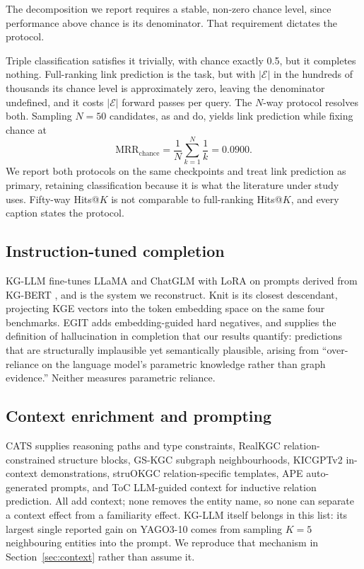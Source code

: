 \documentclass[conference]{IEEEtran}
\begin{document}
The decomposition we report requires a stable, non-zero chance level, since
performance above chance is its denominator. That requirement dictates the
protocol.

Triple classification satisfies it trivially, with chance exactly 0.5, but it
completes nothing. Full-ranking link prediction is the task, but with
$|\mathcal{E}|$ in the hundreds of thousands its chance level is approximately
zero, leaving the denominator undefined, and it costs $|\mathcal{E}|$ forward
passes per query. The $N$-way protocol resolves both. Sampling $N=50$
candidates, as \cite{cats} and \cite{realkgc} do, yields link prediction while
fixing chance at
\begin{equation}
\label{eq:chance}
\mathrm{MRR}_{\text{chance}}=\frac{1}{N}\sum_{k=1}^{N}\frac{1}{k}=0.0900 .
\end{equation}
We report both protocols on the same checkpoints and treat link prediction as
primary, retaining classification because it is what the literature under study
uses. Fifty-way Hits@$K$ is not comparable to full-ranking Hits@$K$, and every
caption states the protocol.

\subsection{Instruction-tuned completion}

KG-LLM \cite{kgllm,kgllama} fine-tunes
LLaMA and ChatGLM with LoRA \cite{lora} on prompts derived from KG-BERT
\cite{kgbert}, and is the system we reconstruct. Knit \cite{knit} is its closest
descendant, projecting KGE vectors into the token embedding space on the same
four benchmarks. EGIT \cite{egit} adds embedding-guided hard negatives, and
supplies the definition of hallucination in completion that our results
quantify: predictions that are structurally implausible yet semantically
plausible, arising from ``over-reliance on the language model's parametric
knowledge rather than graph evidence.'' Neither measures parametric reliance.

\subsection{Context enrichment and prompting}

CATS \cite{cats} supplies reasoning paths and
type constraints, RealKGC \cite{realkgc} relation-constrained structure blocks,
GS-KGC \cite{gskgc} subgraph neighbourhoods, KICGPTv2 \cite{kicgptv2}
in-context demonstrations, struOKGC \cite{struokgc} relation-specific templates,
APE \cite{ape} auto-generated prompts, and ToC \cite{toc} LLM-guided context for
inductive relation prediction. All add context; none removes the
entity name, so none can separate a context effect from a familiarity effect.
KG-LLM itself belongs in this list: its largest single reported gain on
YAGO3-10 comes from sampling $K=5$ neighbouring entities into the prompt. We
reproduce that mechanism in Section~\ref{sec:context} rather than assume it.
\end{document}

